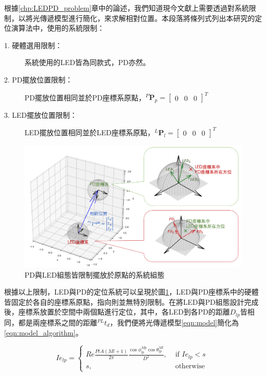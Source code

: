 根據\ref{chp:LEDPD_problem}章中的論述，我們知道現今文獻上需要透過對系統限制，以將光傳遞模型進行簡化，來求解相對位置。本段落將條列式列出本研究的定位演算法中，使用的系統限制：

    \begin{description}

        \item[1. 硬體選用限制：]系統使用的LED皆為同款式，PD亦然。
        \item[2. PD擺放位置限制：]PD擺放位置相同並於PD座標系原點，$^P\boldsymbol{P}_p=
        \left[\begin{array}{ccc}0&0&0\end{array}\right]^T$
        \item[3. LED擺放位置限制：]LED擺放位置相同並於LED座標系原點，$^L\boldsymbol{P}_l=
        \left[\begin{array}{ccc}0&0&0\end{array}\right]^T$

    \end{description}
   
    \begin{figure}[h!]
        \centering
        \includegraphics[width=14cm]{ch3pic/algorithm_place.png}
        \caption{PD與LED組態皆限制擺放於原點的系統組態}
        \label{pic:algorithm_coor}
    \end{figure}

    根據以上限制，LED與PD的定位系統可以呈現於圖\ref{pic:algorithm_coor}，LED與PD座標系中的硬體皆固定於各自的座標系原點，指向則並無特別限制。在將LED與PD組態設計完成後，座標系放置於空間中兩個點進行定位，其中，各LED到各PD的距離$D_{lp}$皆相同，都是兩座標系之間的距離$^{PL}t_d$，我們便將光傳遞模型\ref{eqn:model}簡化為\ref{eqn:model_algorithm}。

    \begin{equation}
        \label{eqn:model_algorithm}
        Ie_{lp} = \begin{cases}Re\frac{PtA(Ml+1)}{2\pi}\frac{\cos\phi_{lp}^{Mp}\cos \theta_{lp}^{Ml}}{D^2} , & \text { if } Ie_{lp}<s \\ s, & \text { otherwise }\end{cases}
    \end{equation}

